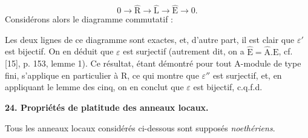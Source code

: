 \begin{equation*}
0 \to \hat{\mathrm{R}} \to \hat{\mathrm{L}} \to \hat{\mathrm{E}} \to 0.
\end{equation*}
Considérons alors le diagramme commutatif :

\begin{center}
\end{center}
Les deux lignes de ce diagramme sont exactes, et, d'autre part, il est clair que $\varepsilon'$ est bijectif. On en déduit que $\varepsilon$ est surjectif (autrement dit, on a $\hat{\mathrm{E}} = \hat{\mathrm{A}}.\mathrm{E}$, cf. [15], p. 153, lemme 1). Ce résultat, étant démontré pour tout $\mathrm{A}$-module de type fini, s'applique en particulier à $\mathrm{R}$, ce qui montre que $\varepsilon''$ est surjectif, et, en appliquant le lemme des cinq, on en conclut que $\varepsilon$ est bijectif, c.q.f.d.


\textbf{24. Propriétés de platitude des anneaux locaux.}

Tous les anneaux locaux considérés ci-dessous sont supposés \emph{noethériens}.


